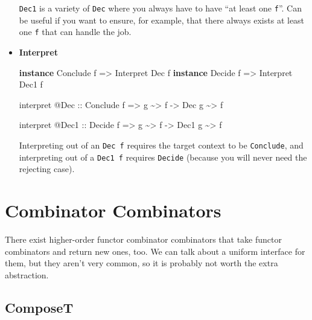 \documentclass[]{article}
\newenvironment{Shaded}{}{}
\newcommand{\DataTypeTok}[1]{\textcolor[rgb]{0.56,0.13,0.00}{#1}}
\newcommand{\KeywordTok}[1]{\textcolor[rgb]{0.00,0.44,0.13}{\textbf{#1}}}
\newcommand{\NormalTok}[1]{#1}
\newcommand{\OperatorTok}[1]{\textcolor[rgb]{0.40,0.40,0.40}{#1}}
\newcommand{\OtherTok}[1]{\textcolor[rgb]{0.00,0.44,0.13}{#1}}
\begin{document}
\begin{itemize}
  \texttt{Dec1} is a variety of \texttt{Dec} where you always have to have ``at
  least one \texttt{f}''. Can be useful if you want to ensure, for example, that
  there always exists at least one \texttt{f} that can handle the job.
\item
  \textbf{Interpret}

\begin{Shaded}
\begin{Highlighting}[]
\KeywordTok{instance} \DataTypeTok{Conclude}\NormalTok{ f }\OtherTok{=>} \DataTypeTok{Interpret} \DataTypeTok{Dec}\NormalTok{  f}
\KeywordTok{instance} \DataTypeTok{Decide}\NormalTok{   f }\OtherTok{=>} \DataTypeTok{Interpret} \DataTypeTok{Dec1}\NormalTok{ f}

\NormalTok{interpret }\OperatorTok{@}\DataTypeTok{Dec}
\OtherTok{    ::} \DataTypeTok{Conclude}\NormalTok{ f}
    \OtherTok{=>}\NormalTok{ g }\OperatorTok{\textasciitilde{}>}\NormalTok{ f}
    \OtherTok{{-}>} \DataTypeTok{Dec}\NormalTok{ g }\OperatorTok{\textasciitilde{}>}\NormalTok{ f}

\NormalTok{interpret }\OperatorTok{@}\DataTypeTok{Dec1}
\OtherTok{    ::} \DataTypeTok{Decide}\NormalTok{ f}
    \OtherTok{=>}\NormalTok{ g }\OperatorTok{\textasciitilde{}>}\NormalTok{ f}
    \OtherTok{{-}>} \DataTypeTok{Dec1}\NormalTok{ g }\OperatorTok{\textasciitilde{}>}\NormalTok{ f}
\end{Highlighting}
\end{Shaded}

  Interpreting out of an \texttt{Dec\ f} requires the target context to be
  \texttt{Conclude}, and interpreting out of a \texttt{Dec1\ f} requires
  \texttt{Decide} (because you will never need the rejecting case).
\end{itemize}

\hypertarget{combinator-combinators}{%
\section{Combinator Combinators}\label{combinator-combinators}}

There exist higher-order functor combinator combinators that take functor
combinators and return new ones, too. We can talk about a uniform interface for
them, but they aren't very common, so it is probably not worth the extra
abstraction.

\hypertarget{composet}{%
\subsection{ComposeT}\label{composet}}
\end{document}

